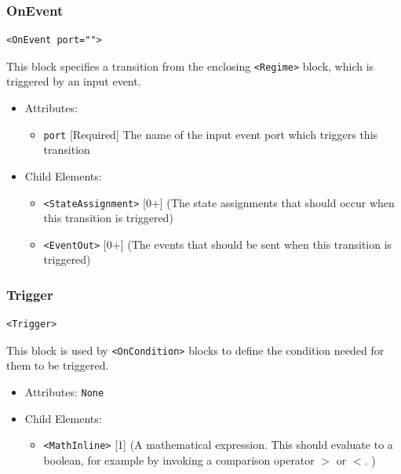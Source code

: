 \documentclass{article}
\begin{document}
\subsubsection{OnEvent}
%
\begin{lstlisting}
<OnEvent port="">
\end{lstlisting}

This block specifies a transition from the enclosing \verb|<Regime>| block, which is triggered
by an input event.

\begin{itemize}
\item Attributes:
%
\begin{itemize}
\item \verb|port| {[}Required{]} The name of the input event port which triggers this
transition
\end{itemize}

\item Child Elements:
%
\begin{itemize}
\item \verb|<StateAssignment>| {[}0+{]} (The state assignments that should occur when this
transition is triggered)
\item \verb|<EventOut>| {[}0+{]} (The events that should be sent when this transition is triggered)
\end{itemize}
\end{itemize}



\subsubsection{Trigger}
%
\begin{lstlisting}
<Trigger>
\end{lstlisting}

This block is used by \verb|<OnCondition>| blocks to define the condition needed for
them to be triggered.

\begin{itemize}
\item Attributes: \texttt{None}

\item Child Elements:
%
\begin{itemize}
\item \verb|<MathInline>| {[}1{]} (A mathematical expression. This should evaluate to a
boolean, for example by invoking a comparison operator  $>$ or $<$. )
\end{itemize}
\end{itemize}
\end{document}
